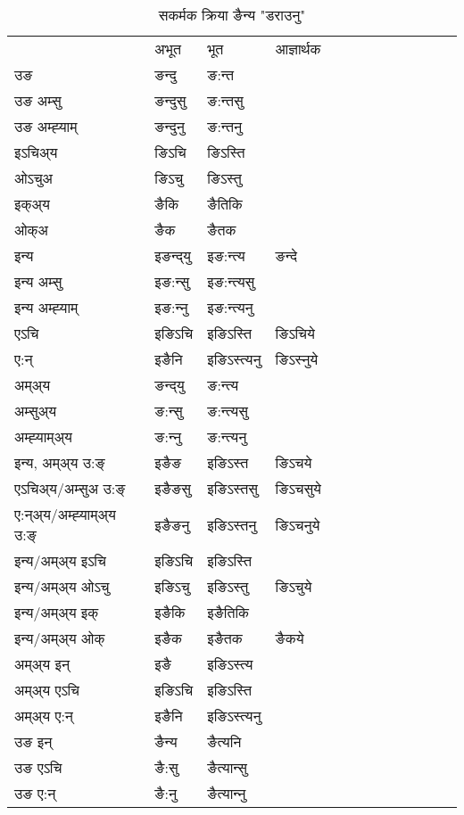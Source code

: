\begin{table}[H]
\label{int.vt} \centering
\caption{सकर्मक क्रिया  ङैन्य  "डराउनु"  }
\begin{tabular}{l|l|l|l|l|l|l|l|l|l|l|l|l}  \toprule
&अभूत & भूत & आज्ञार्थक \\ 
उङ &ङन्दु &ङ:न्त \\ 
उङ अम्सु&ङन्दुसु &ङ:न्तसु \\ 
उङ अम्ह्‍याम्&ङन्दुनु &ङ:न्तनु \\ 
इऽचिअ्य &ङिऽचि &ङिऽस्ति   \\ 
ओऽचुअ        &ङिऽचु &ङिऽस्तु   \\ 
इक्अ्य&ङैकि &ङैतिकि   \\ 
ओक्अ &ङैक &ङैतक   \\ 
इन्य & इङन्द्‌यु  & इङ:न्त्य &ङन्दे  \\ 
इन्य अम्सु& इङ:न्सु  & इङ:न्त्यसु   \\ 
इन्य अम्ह्‍याम्& इङ:न्‍नु  & इङ:न्त्यनु   \\ 
एऽचि & इङिऽचि & इङिऽस्ति &ङिऽचिये    \\ 
ए:न् & इङैनि  & इङिऽस्त्यनु &ङिऽस्‍नुये  \\ 
अम्अ्य & ङन्द्‌यु  & ङ:न्त्य  \\ 
अम्सुअ्य & ङ:न्सु & ङ:न्त्यसु  \\ 
अम्ह्‍याम्अ्य & ङ:न्‍नु  & ङ:न्त्यनु \\ 
\midrule
इन्य, अम्अ्य उ:ङ्‌ &इङैङ &इङिऽस्त &ङिऽचये \\ 
एऽचिअ्य/अम्सुअ उ:ङ्‌ &इङैङसु &इङिऽस्तसु &ङिऽचसुये \\ 
ए:न्अ्य/अम्ह्‍याम्अ्य उ:ङ्‌ &इङैङनु &इङिऽस्तनु &ङिऽचनुये \\ 
इन्य/अम्अ्य इऽचि &इङिऽचि &इङिऽस्ति    \\ 
इन्य/अम्अ्य ओऽचु &इङिऽचु &इङिऽस्तु  &ङिऽचुये  \\ 
इन्य/अम्अ्य इक् &इङैकि &इङैतिकि   \\ 
इन्य/अम्अ्य ओक् &इङैक &इङैतक  &ङैकये  \\ 
अम्अ्य इन् & इङै & इङिऽस्त्य   \\ 
अम्अ्य एऽचि & इङिऽचि & इङिऽस्ति    \\ 
अम्अ्य ए:न् & इङैनि  & इङिऽस्त्यनु  \\ 
\midrule
उङ इन् & ङैन्य  & ङैत्यनि  \\ 
उङ एऽचि & ङै:सु  & ङैत्यान्सु   \\ 
उङ ए:न्& ङै:नु  & ङैत्यान्‍नु   \\ 
\bottomrule
\end{tabular}
\end{table}


